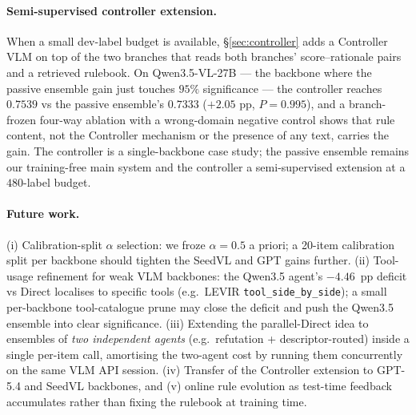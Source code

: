 \paragraph{Semi-supervised controller extension.}
When a small dev-label budget is available, \S\ref{sec:controller} adds a Controller VLM on top of the two branches that reads both branches' score--rationale pairs and a retrieved rulebook. On Qwen3.5-VL-27B --- the backbone where the passive ensemble gain just touches $95\%$ significance --- the controller reaches $0.7539$ vs the passive ensemble's $0.7333$ ($+2.05$ pp, $P{=}0.995$), and a branch-frozen four-way ablation with a wrong-domain negative control shows that rule content, not the Controller mechanism or the presence of any text, carries the gain. The controller is a single-backbone case study; the passive ensemble remains our training-free main system and the controller a semi-supervised extension at a $480$-label budget.

\paragraph{Future work.}
(i) Calibration-split $\alpha$ selection: we froze $\alpha{=}0.5$ a priori; a 20-item calibration split per backbone should tighten the SeedVL and GPT gains further. (ii) Tool-usage refinement for weak VLM backbones: the Qwen3.5 agent's $-4.46$~pp deficit vs Direct localises to specific tools (e.g.\ LEVIR \texttt{tool\_side\_by\_side}); a small per-backbone tool-catalogue prune may close the deficit and push the Qwen3.5 ensemble into clear significance. (iii) Extending the parallel-Direct idea to ensembles of \emph{two independent agents} (e.g.\ refutation + descriptor-routed) inside a single per-item call, amortising the two-agent cost by running them concurrently on the same VLM API session. (iv) Transfer of the Controller extension to GPT-5.4 and SeedVL backbones, and (v) online rule evolution as test-time feedback accumulates rather than fixing the rulebook at training time.
